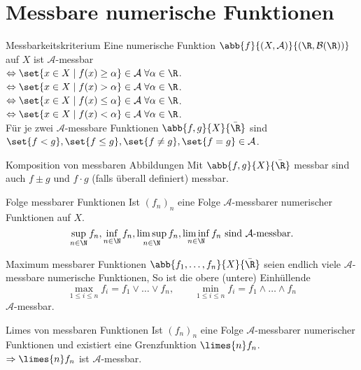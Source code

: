 \section*{Messbare numerische Funktionen}

\begin{karte}{Messbarkeitskriterium}
	Eine numerische Funktion \(  \abb{f}{(X, \mathcal{A})}{(\R, \mathcal{B}(\R))}\) auf \(X\) ist 
	\( \mathcal{A} \)-messbar \\
	\( \Leftrightarrow \set{x \in X \;|\; f(x) \geq \alpha} \in \mathcal{A} \;\forall \alpha \in \R \). \\
	\( \Leftrightarrow \set{x \in X \;|\; f(x) > \alpha} \in \mathcal{A} \;\forall \alpha \in \R \). \\
	\( \Leftrightarrow \set{x \in X \;|\; f(x) \leq \alpha} \in \mathcal{A} \;\forall \alpha \in \R \). \\
	\( \Leftrightarrow \set{x \in X \;|\; f(x) < \alpha} \in \mathcal{A} \;\forall \alpha \in \R \). \\
	Für je zwei \( \mathcal{A} \)-messbare Funktionen 
	\( \abb{f, g}{X}{\bar{\R}} \) sind 
	\( \set{f < g}, \set{f \leq g}, \set{ f \neq g }, \set{f = g} \in \mathcal{A} \).
\end{karte}

\begin{karte}{Komposition von messbaren Abbildungen}
	Mit \( \abb{f,g}{X}{\bar{\R}} \) messbar sind auch 
	\( f\pm g \) und \( f \cdot g \) (falls überall definiert) messbar.
\end{karte}

\begin{karte}{Folge messbarer Funktionen}
	Ist \( (f_n)_n \) eine Folge \( \mathcal{A} \)-messbarer 
	numerischer Funktionen auf \(X\).
	\[ \sup_{n\in\N} f_n, \inf_{n\in\N} f_n, \limsup_{n\in\N} f_n, \liminf_{n\in\N} f_n 
	\text{ sind } \mathcal{A}\text{-messbar}. \]
\end{karte}

\begin{karte}{Maximum messbarer Funktionen}
	\( \abb{f_1, \ldots, f_n}{X}{\bar{\R}} \) 
	seien endlich viele \( \mathcal{A} \)-messbare 
	numerische Funktionen,
	So ist die obere (untere) Einhüllende 
	\[ \max_{1\leq i \leq n} f_i 
	= f_1 \vee \ldots \vee f_n, \qquad 
	\min_{1 \leq i \leq n} f_i 
	= f_1 \wedge \ldots \wedge f_n \]
	\( \mathcal{A} \)-messbar.
\end{karte}

\begin{karte}{Limes von messbaren Funktionen}
	Ist \( (f_n)_n \) eine Folge \( \mathcal{A} \)-messbarer numerischer Funktionen und 
	existiert eine Grenzfunktion 
	\( \limes{n} f_n \).\\
	\( \Rightarrow \limes{n} f_n \) ist \(\mathcal{A}\)-messbar.
\end{karte}

